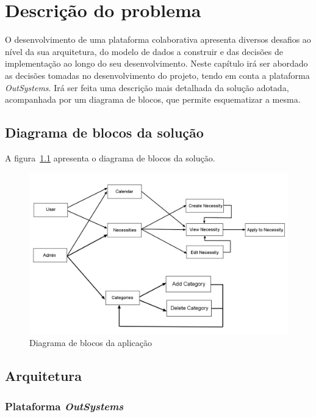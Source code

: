 \chapter{Descrição do problema}\label{chapter:description}

O desenvolvimento de uma plataforma colaborativa apresenta diversos desafios ao nível da sua arquitetura, 
do modelo de dados a construir e das decisões de implementação ao longo do seu desenvolvimento. 
Neste capítulo irá ser abordado as decisões tomadas no desenvolvimento do projeto, tendo em conta a plataforma \textit{OutSystems}. 
Irá ser feita uma descrição mais detalhada da solução adotada, acompanhada por um diagrama de blocos, que permite esquematizar a mesma.


\section{Diagrama de blocos da solução}\label{sec:diagram}
A figura~\ref{fig:diagram} apresenta o diagrama de blocos da solução. 

\begin{figure}[H]
  \centering
  \includegraphics[scale=0.4]{figures/Diagrama de blocos.png}
  \caption{Diagrama de blocos da aplicação}\label{fig:diagram}
\end{figure}

\newpage

\section{Arquitetura}\label{sec:arquitechture}

\subsection{Plataforma \textit{OutSystems}}


